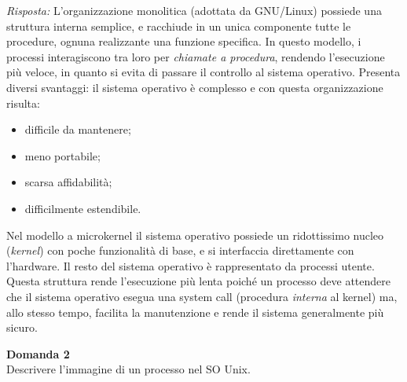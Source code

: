 \documentclass{article}
\newenvironment{problem}[2][Domanda]
    { \begin{mdframed}[backgroundcolor=gray!20] \textbf{#1 #2} \\}
    {  \end{mdframed}}
\newenvironment{solution}
    {\textit{Risposta:}}
    {}
\begin{document}
\begin{solution}
L’organizzazione monolitica (adottata da GNU/Linux) possiede una struttura interna semplice, e racchiude in un unica componente tutte le procedure, ognuna realizzante una funzione specifica.
\newline
In questo modello, i processi interagiscono tra loro per \textit{chiamate a procedura}, rendendo l’esecuzione più veloce, in quanto si evita di passare il controllo al sistema operativo.
\newline
\newline
Presenta diversi svantaggi: il sistema operativo è complesso e con questa organizzazione risulta:
\begin{itemize}
    \item difficile da mantenere;
    \item meno portabile;
    \item scarsa affidabilità;
    \item difficilmente estendibile.
\end{itemize}
Nel modello a microkernel il sistema operativo possiede un ridottissimo nucleo (\textit{kernel}) con poche funzionalità di base, e si interfaccia direttamente con l’hardware.
\newline
Il resto del sistema operativo è rappresentato da processi utente.
\newline
Questa struttura rende l’esecuzione più lenta poiché un processo deve attendere che il sistema operativo esegua una system call (procedura \textit{interna} al kernel) ma, allo stesso tempo, facilita la manutenzione e rende il sistema generalmente più sicuro.
\end{solution}
\begin{problem}{2}
Descrivere l'immagine di un processo nel SO Unix.
\end{problem}
\end{document}
